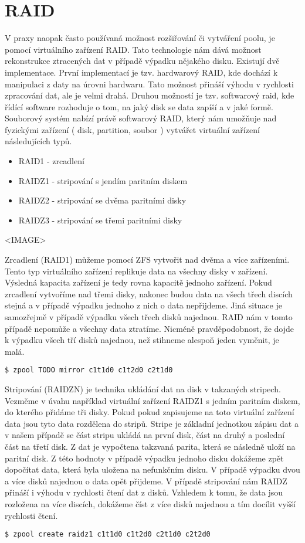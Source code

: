 \section{RAID}
V praxy naopak často používaná možnost rozšiřování či vytváření poolu, je pomocí virtuálního zařízení RAID. Tato technologie nám dává možnost rekonstrukce ztracených dat v případě výpadku nějakého disku. Existují dvě implementace. První implementací je tzv. hardwarový RAID, kde dochází k manipulaci z daty na úrovni hardwaru. Tato možnost přináší výhodu v rychlosti zpracování dat, ale je velmi drahá. Druhou možností je tzv. softwarový raid, kde řídící software rozhoduje o tom, na jaký disk se data zapíší a v jaké formě. Souborový systém nabízí právě softwarový RAID, který nám umožňuje nad fyzickými zařízení ( disk, partition, soubor ) vytvářet virtuální zařízení následujících typů.
\begin{itemize}
  \item RAID1 - zrcadlení
  \item RAIDZ1 - stripování s jendím paritním diskem
  \item RAIDZ2 - stripování se dvěma paritními disky
  \item RAIDZ3 - stripování se třemi paritními disky
\end{itemize}
<IMAGE>

Zrcadlení (RAID1) můžeme pomocí ZFS vytvořit nad dvěma a více zařízeními. Tento typ virtuálního zařízení replikuje data na všechny disky v zařízení. Výsledná kapacita zařízení je tedy rovna kapacitě jednoho zařízení. Pokud zrcadlení vytvoříme nad třemi disky, nakonec budou data na všech třech discích stejná a v případě výpadku jednoho z nich o data nepřijdeme. Jiná situace je samozřejmě v případě výpadku všech třech disků najednou. RAID nám v tomto případě nepomůže a všechny data ztratíme. Nicméně pravděpodobnost, že dojde k výpadku všech
tří disků najednou, než stihneme alespoň jeden vyměnit, je malá.
\begin{verbatim}
$ zpool TODO mirror c1t1d0 c1t2d0 c2t1d0
\end{verbatim}

Stripování (RAIDZN) je technika ukládání dat na disk v takzaných stripech. Vezměme v úvahu například virtuální zařízení RAIDZ1 s jedním paritním diskem, do kterého přidáme tři disky. Pokud pokud zapisujeme na toto virtuální zařízení data jsou tyto data rozdělena do stripů. Stripe je základní jednotkou zápisu dat a v našem případě se část stripu ukládá na první disk, část na druhý a poslední část na třetí disk. Z dat je vypočtena takzvaná parita, která se následně uloží na paritní disk. Z této hodnoty v případě výpadku jednoho disku dokážeme zpět dopočítat data, která byla uložena na nefunkčním disku. V případě výpadku dvou a více disků najednou o data opět přijdeme. V případě stripování nám RAIDZ přináší i výhodu v rychlosti čtení dat z disků. Vzhledem k tomu, že data jsou rozložena na více discích, dokážeme číst z více disků najednou a tím docílit vyšší rychlosti čtení.
\begin{verbatim}
$ zpool create raidz1 c1t1d0 c1t2d0 c2t1d0 c2t2d0
\end{verbatim}

